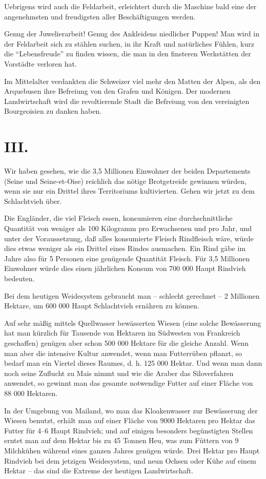 \documentclass{scrbook}
\begin{document}
Uebrigens wird auch die Feldarbeit, erleichtert durch die Maschine bald eine der angenehmsten und freudigsten aller Beschäftigungen werden.

Genug der Juwelierarbeit! Genug des Ankleidens niedlicher Puppen! Man wird in der Feldarbeit sich zu stählen suchen, in ihr Kraft und natürliches Fühlen, kurz die ``Lebensfreude'' zu finden wissen, die man in den finsteren Werkstätten der Vorstädte verloren hat.

Im Mittelalter verdankten die Schweizer viel mehr den Matten der Alpen, als den Arquebusen ihre Befreiung von den Grafen und Königen. Der modernen Landwirtschaft wird die revoltierende Stadt die Befreiung von den vereinigten Bourgeoisien zu danken haben.

\section*{III.}

Wir haben gesehen, wie die 3,5 Millionen Einwohner der beiden Departements (Seine und Seine-et-Oise) reichlich das nötige Brotgetreide gewinnen würden, wenn sie nur ein Drittel ihres Territoriums kultivierten. Gehen wir jetzt zu dem Schlachtvieh über.

Die Engländer, die viel Fleisch essen, konsumieren eine durchschnittliche Quantität von weniger als 100 Kilogramm pro Erwachsenen und pro Jahr, und unter der Voraussetzung, daß alles konsumierte Fleisch Rindfleisch wäre, würde dies etwas weniger als ein Drittel eines Rindes ausmachen. Ein Rind gäbe im Jahre also für 5 Personen eine genügende Quantität Fleisch. Für 3,5 Millionen Einwohner würde dies einen jährlichen Konsum von 700 000 Haupt Rindvieh bedeuten.

Bei dem heutigen Weidesystem gebraucht man – schlecht gerechnet – 2 Millionen Hektare, um 600 000 Haupt Schlachtvieh ernähren zu können.

Auf sehr mäßig mittels Quellwasser bewässerten Wiesen (eine solche Bewässerung hat man kürzlich für Tausende von Hektaren im Südwesten von Frankreich geschaffen) genügen aber schon 500 000 Hektare für die gleiche Anzahl. Wenn man aber die intensive Kultur anwendet, wenn man Futterrüben pflanzt, so bedarf man ein Viertel dieses Raumes, d. h. 125 000 Hektar. Und wenn man dann noch seine Zuflucht zu Mais nimmt und wie die Araber das Siloverfahren anwendet, so gewinnt man das gesamte notwendige Futter auf einer Fläche von 88 000 Hektaren.

In der Umgebung von Mailand, wo man das Kloakenwasser zur Bewässerung der Wiesen benutzt, erhält man auf einer Fläche von 9000 Hektaren pro Hektar das Futter für 4–6 Haupt Rindvieh; und auf einigen besonders begünstigten Stellen erntet man auf dem Hektar bis zu 45 Tonnen Heu, was zum Füttern von 9 Milchkühen während eines ganzen Jahres genügen würde. Drei Hektar pro Haupt Rindvieh bei dem jetzigen Weidesystem, und neun Ochsen oder Kühe auf einem Hektar – das sind die Extreme der heutigen Landwirtschaft.
\end{document}
